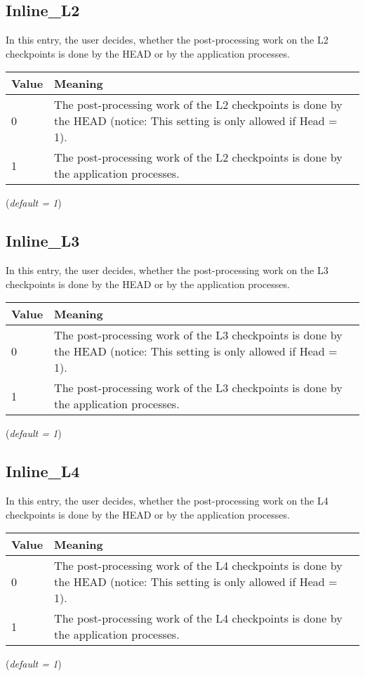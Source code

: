 \documentclass{refrep}
\begin{document}
\subsection{Inline\_L2}\label{subsec:inlinel2}
In this entry, the user decides, whether the post-processing work on the L2 checkpoints is done by the HEAD or by the application processes.
\begin{center}
\begin{tabular}[h!]{|p{}|p{}|}
\hline
\textbf{Value} & \textbf{Meaning} \\ \hline
0 & The post-processing work of the L2 checkpoints is done by the HEAD (notice: This setting is only allowed if Head = 1).  \\ \hline
1 & The post-processing work of the L2 checkpoints is done by the application processes.  \\ \hline
\end{tabular}
\end{center}
(\textit{default = 1})
\subsection{Inline\_L3}\label{subsec:inlinel3}
In this entry, the user decides, whether the post-processing work on the L3 checkpoints is done by the HEAD or by the application processes.
\begin{center}
\begin{tabular}[h!]{|p{}|p{}|}
\hline
\textbf{Value} & \textbf{Meaning} \\ \hline
0 & The post-processing work of the L3 checkpoints is done by the HEAD (notice: This setting is only allowed if Head = 1).  \\ \hline
1 & The post-processing work of the L3 checkpoints is done by the application processes.  \\ \hline
\end{tabular}
\end{center}
(\textit{default = 1})
\subsection{Inline\_L4}\label{subsec:inlinel4}
In this entry, the user decides, whether the post-processing work on the L4 checkpoints is done by the HEAD or by the application processes.
\begin{center}
\begin{tabular}[h!]{|p{}|p{}|}
\hline
\textbf{Value} & \textbf{Meaning} \\ \hline
0 & The post-processing work of the L4 checkpoints is done by the HEAD (notice: This setting is only allowed if Head = 1).  \\ \hline
1 & The post-processing work of the L4 checkpoints is done by the application processes.  \\ \hline
\end{tabular}
\end{center}
(\textit{default = 1})
\end{document}

